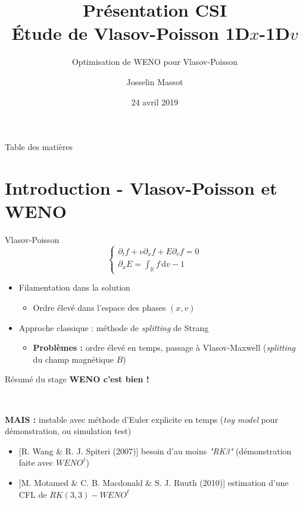 \documentclass{beamer}
\title[Présentation CSI]{Présentation CSI\\ Étude de Vlasov-Poisson 1D$x$-1D$v$}
\subtitle{Optimisation de WENO pour Vlasov-Poisson}
\author{Josselin Massot}
\institute{IRMAR}
\date{24 avril 2019}
\newcommand{\cmark}{{\color{dgreen}\ding{51}}}%
\begin{document}
\begin{frame}[plain,t]
  \titlepage
\end{frame}

\begin{frame}{Table des matières}
  \tableofcontents
\end{frame}

\section{Introduction - Vlasov-Poisson et WENO}
\begin{frame}{Vlasov-Poisson}
  $$
    \begin{cases}
      \partial_t f + v\partial_x f + E\partial_v f = 0 \\
      \partial_x E = \int_{\mathbb{R}} f\,\mathrm{d}v - 1
    \end{cases}
  $$

  \begin{itemize}
    \item Filamentation dans la solution
      \begin{itemize}
        \item Ordre élevé dans l'espace des phases $(x,v)$
      \end{itemize}
    \item Approche classique : méthode de \emph{splitting} de Strang
      \begin{itemize}
        \item \textbf{Problèmes :} ordre élevé en temps, passage à Vlasov-Maxwell (\emph{splitting} du champ magnétique $B$)
      \end{itemize}
  \end{itemize}
\end{frame}

\begin{frame}{Résumé du stage}
  \textbf{WENO c'est bien !} \cmark

  \ 

  \textbf{MAIS : } instable avec méthode d'Euler explicite en temps (\emph{toy model} pour démonstration, ou simulation test)
  \begin{itemize}
    \item {[R. Wang \& R. J. Spiteri (2007)]} besoin d'au moins \emph{"RK3"} (démonstration faite avec $WENO^{\ell}$)
    \item {[M. Motamed \& C. B. Macdonald \& S. J. Ruuth (2010)]} estimation d'une CFL de $RK(3,3)-WENO^{\ell}$
  \end{itemize}
\end{frame}
\end{document}
